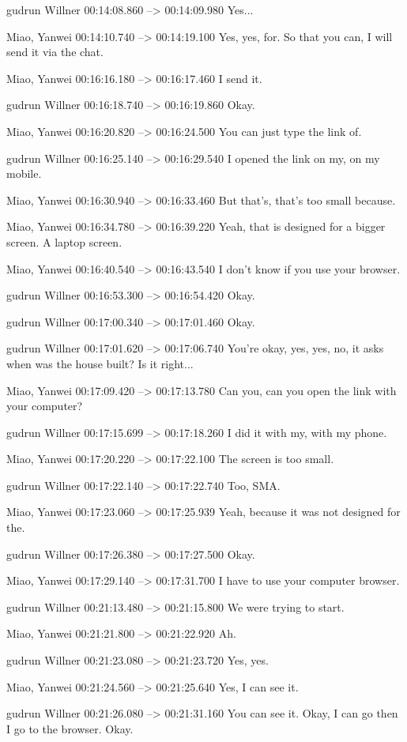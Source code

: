 {gudrun Willner 00:14:08.860 --> 00:14:09.980
Yes...

Miao, Yanwei 00:14:10.740 --> 00:14:19.100
Yes, yes, for. So that you can, I will send it via the chat.

Miao, Yanwei 00:16:16.180 --> 00:16:17.460
I send it.

gudrun Willner 00:16:18.740 --> 00:16:19.860
Okay.

Miao, Yanwei 00:16:20.820 --> 00:16:24.500
You can just type the link of.

gudrun Willner 00:16:25.140 --> 00:16:29.540
I opened the link on my, on my mobile.

Miao, Yanwei 00:16:30.940 --> 00:16:33.460
But that's, that's too small because.

Miao, Yanwei 00:16:34.780 --> 00:16:39.220
Yeah, that is designed for a bigger screen. A laptop screen.

Miao, Yanwei 00:16:40.540 --> 00:16:43.540
I don't know if you use your browser.

gudrun Willner 00:16:53.300 --> 00:16:54.420
Okay.

gudrun Willner 00:17:00.340 --> 00:17:01.460
Okay.

gudrun Willner 00:17:01.620 --> 00:17:06.740
You're okay, yes, yes, no, it asks when was the house built? Is it right...

Miao, Yanwei 00:17:09.420 --> 00:17:13.780
Can you, can you open the link with your computer?

gudrun Willner 00:17:15.699 --> 00:17:18.260
I did it with my, with my phone.

Miao, Yanwei 00:17:20.220 --> 00:17:22.100
The screen is too small.

gudrun Willner 00:17:22.140 --> 00:17:22.740
Too, SMA.

Miao, Yanwei 00:17:23.060 --> 00:17:25.939
Yeah, because it was not designed for the.

gudrun Willner 00:17:26.380 --> 00:17:27.500
Okay.

Miao, Yanwei 00:17:29.140 --> 00:17:31.700
I have to use your computer browser.

gudrun Willner 00:21:13.480 --> 00:21:15.800
We were trying to start.

Miao, Yanwei 00:21:21.800 --> 00:21:22.920
Ah.

gudrun Willner 00:21:23.080 --> 00:21:23.720
Yes, yes.

Miao, Yanwei 00:21:24.560 --> 00:21:25.640
Yes, I can see it.

gudrun Willner 00:21:26.080 --> 00:21:31.160
You can see it. Okay, I can go then I go to the browser. Okay.

}
